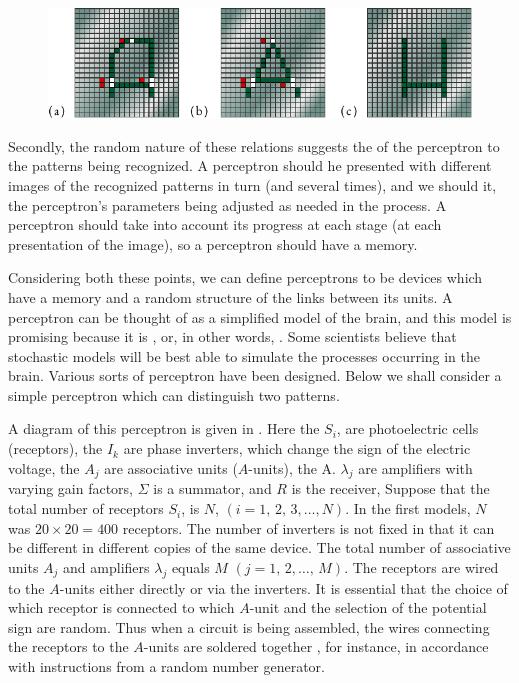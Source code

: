 \begin{figure}[!ht]
 \centering
 \includegraphics[width=\linewidth]{figures/perceptron1.pdf}
 \end{figure}
Secondly, the random nature of these relations suggests the 
of the perceptron to the patterns being recognized. A perceptron should
he presented with different images of the recognized patterns in turn
(and several times), and we should  it, the perceptron's parameters
being adjusted as needed in the process. A perceptron should take into
account its progress at each stage (at each presentation of the image), so
a perceptron should have a memory.

Considering both these points, we can define perceptrons to be
devices which have a memory and a random structure of the links
between its units. A perceptron can be thought of as a simplified model
of the brain, and this model is promising because it is , or,
in other words, . Some scientists believe that stochastic models will be best able to simulate the processes occurring in the brain.
Various sorts of perceptron have been designed. Below we shall
consider a simple perceptron which can distinguish two patterns.

 A diagram of this
perceptron is given in . Here the $S_{i}$, are photoelectric cells (receptors), the $I_{k}$ are phase inverters, which change the sign of the electric voltage, the $A_{j}$ are associative units ($A$-units), the A. $\lambda_{j}$ are amplifiers with varying gain factors, $\Sigma$ is a summator, and $R$ is the receiver, Suppose that the total number of receptors $S_{i}$, is $N$, $(i = 1, \, 2, \, 3, \ldots{} , N)$. In the first models, $N$ was $20 \times 20 = 400$ receptors. The number of inverters is not fixed in that it can be different in different copies of the same device. The total number of associative units $A_{j}$ and amplifiers $\lambda_{j}$ equals $M \,\, (j = 1, \, 2, \ldots{} ,\, M)$. The receptors are wired to the $A$-units either directly or via the inverters. It is essential that the choice of which receptor is connected to which $A$-unit and the selection of the potential sign are random. Thus when a circuit is being assembled, the wires connecting the receptors to the $A$-units are soldered together , for instance, in accordance with instructions from a random
number generator.

